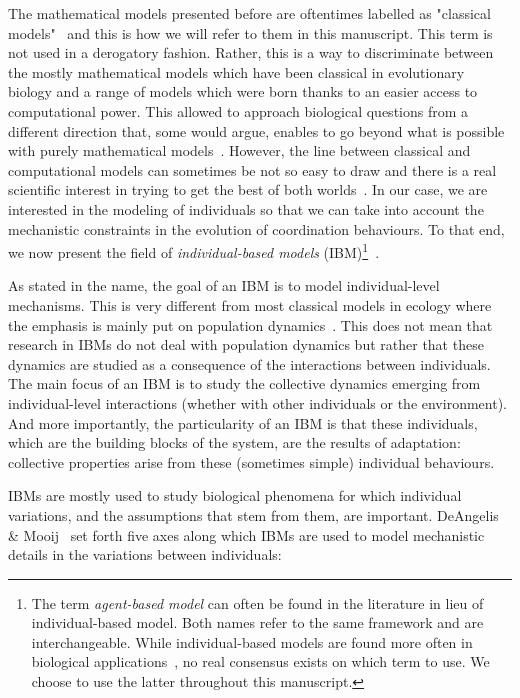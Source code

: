     The mathematical models presented before are oftentimes labelled as "classical models"~\parencite{DeAngelis2005, Adami2014} and this is how we will refer to them in this manuscript. This term is not used in a derogatory fashion. Rather, this is a way to discriminate between the mostly mathematical models which have been classical in evolutionary biology and a range of models which were born thanks to an easier access to computational power. This allowed to approach biological questions from a different direction that, some would argue, enables to go beyond what is possible with purely mathematical models~\parencite{Adami2012}. However, the line between classical and computational models can sometimes be not so easy to draw and there is a real scientific interest in trying to get the best of both worlds~\parencite{Wilson1998}. In our case, we are interested in the modeling of individuals so that we can take into account the mechanistic constraints in the evolution of coordination behaviours. To that end, we now present the field of \emph{individual-based models} (IBM)\footnote{The term \emph{agent-based model} can often be found in the literature in lieu of individual-based model. Both names refer to the same framework and are interchangeable. While individual-based models are found more often in biological applications~\parencite{Grimm2005}, no real consensus exists on which term to use. We choose to use the latter throughout this manuscript.}~\parencite{Huston1988}.

    As stated in the name, the goal of an IBM is to model individual-level mechanisms. This is very different from most classical models in ecology where the emphasis is mainly put on population dynamics~\parencite{Grimm2005}. This does not mean that research in IBMs do not deal with population dynamics but rather that these dynamics are studied as a consequence of the interactions between individuals. The main focus of an IBM is to study the collective dynamics emerging from individual-level interactions (whether with other individuals or the environment). And more importantly, the particularity of an IBM is that these individuals, which are the building blocks of the system, are the results of adaptation: collective properties arise from these (sometimes simple) individual behaviours.

    IBMs are mostly used to study biological phenomena for which individual variations, and the assumptions that stem from them, are important. DeAngelis \& Mooij~\parencite{DeAngelis2005} set forth five axes along which IBMs are used to model mechanistic details in the variations between individuals:

